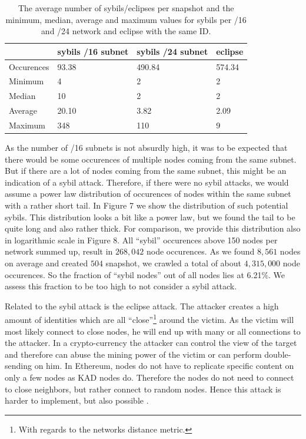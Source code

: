 \documentclass[10pt,conference,final]{IEEEtran}
\begin{document}
\begin{table}[!t]
\renewcommand{\arraystretch}{1.3}
\begin{tabular}{M{0.12\textwidth} | M{0.1\textwidth} | M{0.1\textwidth} | M{0.07\textwidth}}
 & sybils /16 subnet & sybils /24 subnet & eclipse \\ \hline
Occurences & 93.38 & 490.84 & 574.34 \\
Minimum & 4 & 2 & 2 \\
Median & 10 & 2 & 2 \\
Average & 20.10 & 3.82 & 2.09 \\
Maximum & 348 & 110 & 9 \\
\end{tabular}
\caption{The average number of sybils/eclipses per snapshot and the minimum, median, average and maximum values for sybils per /16 and /24 network and eclipse with the same ID.}
\label{tab:6}
\end{table}

As the number of /16 subnets is not absurdly high, it was to be expected that there would be some occurences of multiple nodes coming from the same subnet.
But if there are a lot of nodes coming from the same subnet, this might be an indication of a sybil attack.
Therefore, if there were no sybil attacks, we would assume a power law distribution of occurences of nodes within the same subnet with a rather short tail.
In Figure 7 we show the distribution of such potential sybils.
This distribution looks a bit like a power law, but we found the tail to be quite long and also rather thick.
For comparison, we provide this distribution also in logarithmic scale in Figure 8.
All ``sybil'' occurences above 150 nodes per network summed up, result in $268,042$ node occurences.
As we found $8,561$ nodes on average and created $504$ snapshot, we crawled a total of about $4,315,000$ node occurences.
So the fraction of ``sybil nodes'' out of all nodes lies at 6.21\%.
We assess this fraction to be too high to not consider a sybil attack.

Related to the sybil attack is the eclipse attack.
The attacker creates a high amount of identities which are all ``close''\footnote{With regards to the networks distance metric.} around the victim.
As the victim will most likely connect to close nodes, he will end up with many or all connections to the attacker.
In a crypto-currency the attacker can control the view of the target and therefore can abuse the mining power of the victim or can perform double-sending on him. \cite{19}
In Ethereum, nodes do not have to replicate specific content on only a few nodes as KAD nodes do.
Therefore the nodes do not need to connect to close neighbors, but rather connect to random nodes.
Hence this attack is harder to implement, but also possible \cite{20}.
\end{document}
